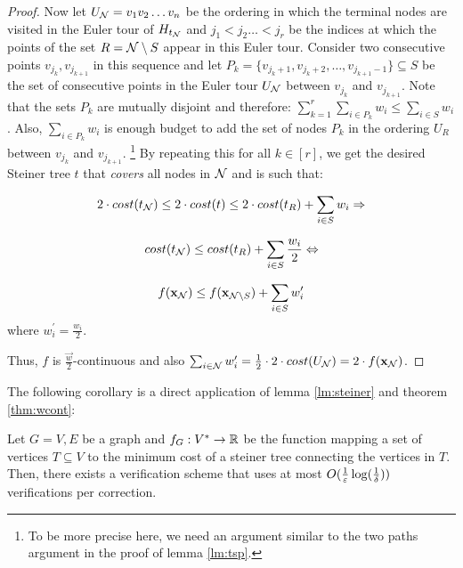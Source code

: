 \begin{proof}
Now let $U_{\mathcal{N}}=v_1v_2\dots v_n$ be the ordering in which the terminal nodes are visited in the Euler tour of $H_{t_{\mathcal{N}}}$ and $j_1<j_2\dots <j_r$ be the
indices at which the points of the set $R=\mathcal{N}\setminus S$ appear in this Euler tour.  Consider two consecutive points $v_{j_k},v_{j_{k+1}}$ in this sequence and let
$P_k=\{v_{j_k+1},v_{j_k+2},\dots, v_{j_{k+1}-1}\}\subseteq  S$ be the set of consecutive points in the Euler tour $U_{\mathcal{N}}$ between $v_{j_k}$ and
$v_{j_{k+1}}$. Note that the sets $P_k$ are mutually disjoint and therefore: $\sum_{k=1}^r \sum_{i\in P_k}w_i \le \sum_{i\in  S}w_i$. Also,
$\sum_{i\in P_k}w_i$ is enough budget to add the set of nodes $P_k$ in the ordering $U_R$ between $v_{j_k}$ and $v_{j_{k+1}}$. \footnote{To be more precise here, we
need an argument similar to the two paths argument in the proof of lemma \ref{lm:tsp}.}  By repeating this for all $k\in [r]$, we get the desired Steiner tree $t$
that \emph{covers} all nodes in $\mathcal{N}$ and is such that:

\[
2\cdot cost(t_{\mathcal{N}})\le 2\cdot cost(t) \le 2\cdot cost(t_R) +   \sum_{i\in  S}w_i \Rightarrow
\]


\[
 cost(t_{\mathcal{N}})\le  cost(t_R) +   \sum_{i\in  S}\frac{w_i}{2} \Leftrightarrow
\]


\[
 f(\mathbf{x}_{\mathcal{N}})\le  f(\mathbf{x}_{\mathcal{N}\setminus S}) +   \sum_{i\in S}w_i^\prime
\]where $w_i^\prime=\frac{w_i}{2}$.

Thus, $f$ is $\frac{\vec{w}}{2}$-continuous and also $\sum_{i\in \mathcal{N}}w_i^\prime = \frac{1}{2}\cdot 2\cdot cost(U_{\mathcal{N}})=2\cdot f(\mathbf{x}_{\mathcal{N}})$.
\end{proof}


The following corollary is a direct application of  lemma \ref{lm:steiner} and theorem \ref{thm:wcont}:

\begin{corollary}
Let $G=V,E$ be a graph and $f_G : V^* \to \mathbb{R}$ be the function mapping a set of vertices $T\subseteq V$ to the minimum cost of a steiner tree connecting the
vertices in $T$. Then, there exists a verification scheme that uses at most $O(\frac{1}{\varepsilon}\log(\frac{1}{\delta}))$ verifications per correction.
\end{corollary}
